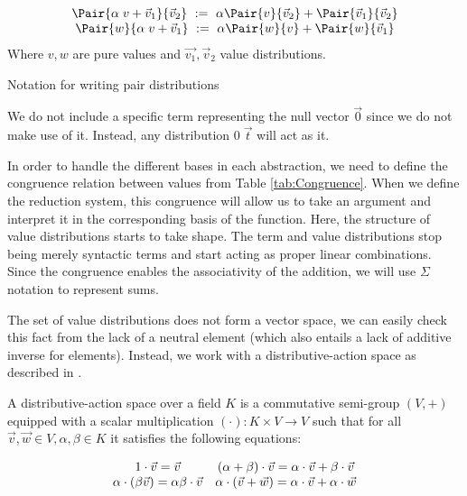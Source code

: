  \begin{table*}[tb]
  \[
    \begin{array}{c}
      \Pair{\alpha\; v+\vec{v}_1}{\vec{v}_2}~ := ~\alpha\Pair{v}{\vec{v}_2} + \Pair{\vec{v}_1}{\vec{v}_2}\\
      \Pair{w}{\alpha\; v+\vec{v}_1}~ := ~\alpha\Pair{w}{v} + \Pair{w}{\vec{v}_1}
    \end{array}
  \]
  Where $v,w$ are pure values and $\vec{v_1}, \vec{v}_2$ value distributions.
  \caption{Notation for writing pair distributions}
  \label{tab:PairsNotation}
 \end{table*}

\begin{remark}
  We do not include a specific term representing the null vector $\vec{0}$ since we do not make use of it. Instead, any distribution $0\;\vec{t}$ will act as it.
\end{remark}

In order to handle the different bases in each abstraction, we need to define the congruence relation between values from Table \ref{tab:Congruence}. When we define the reduction system, this congruence will allow us to take an argument and interpret it in the corresponding basis of the function. Here, the structure of value distributions starts to take shape. The term and value distributions stop being merely syntactic terms and start acting as proper linear combinations. Since the congruence enables the associativity of the addition, we will use $\Sigma$ notation to represent sums.

The set of value distributions does not form a vector space, we can easily check this fact from the lack of a neutral element (which also entails a lack of additive inverse for elements). Instead, we work with a distributive-action space as described in \cite{DiazCaroMalherbe2022}.

A distributive-action space over a field $K$ is a commutative semi-group $(V,+)$ equipped with a scalar multiplication $(\cdot): K\times V\to V$ such that for all $\vec{v},\vec{w}\in V, \alpha,\beta\in K$ it satisfies the following equations:

\[
\begin{array}{c c}
1\cdot \vec{v} = \vec{v} & (\alpha + \beta)\cdot\vec{v} = \alpha\cdot\vec{v} + \beta\cdot\vec{v}\\
\alpha\cdot(\beta\vec{v}) = \alpha\beta\cdot \vec{v} & \alpha\cdot(\vec{v} + \vec{w}) = \alpha\cdot\vec{v} + \alpha\cdot\vec{w}
\end{array}
\]

